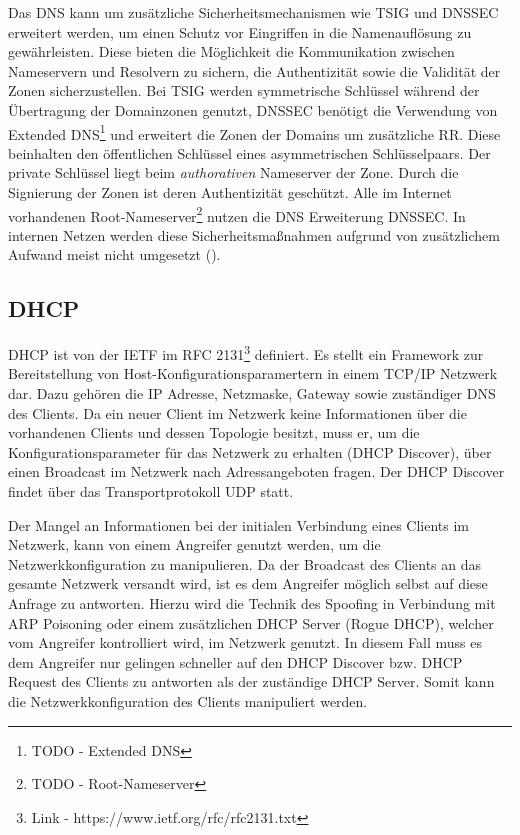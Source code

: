 Das \ac{DNS} kann um zusätzliche Sicherheitsmechanismen wie \ac{TSIG} und \ac{DNSSEC} erweitert werden, um einen Schutz vor Eingriffen in die Namenauflösung zu gewährleisten. Diese bieten die Möglichkeit die Kommunikation zwischen Nameservern und Resolvern zu sichern, die Authentizität sowie die Validität der Zonen sicherzustellen. Bei \ac{TSIG} werden symmetrische Schlüssel während der Übertragung der Domainzonen genutzt, \ac{DNSSEC} benötigt die Verwendung von Extended \ac{DNS}\footnote{TODO - Extended DNS} und erweitert die Zonen der Domains um zusätzliche \ac{RR}. Diese beinhalten den öffentlichen Schlüssel eines asymmetrischen Schlüsselpaars. Der private Schlüssel liegt beim \textit{authorativen} Nameserver der Zone. Durch die Signierung der Zonen ist deren Authentizität geschützt. Alle im Internet vorhandenen Root-Nameserver\footnote{TODO - Root-Nameserver} nutzen die \ac{DNS} Erweiterung \ac{DNSSEC}. In internen Netzen werden diese Sicherheitsmaßnahmen aufgrund von zusätzlichem Aufwand meist nicht umgesetzt (\cite{Ledermueller2009}).

\subsection{\ac{DHCP}}
\label{Analyse:DHCP}
\ac{DHCP} ist von der \ac{IETF} im \ac{RFC} 2131\footnote{Link - https://www.ietf.org/rfc/rfc2131.txt} definiert. Es stellt ein Framework zur Bereitstellung von Host-Konfigurationsparamertern in einem \ac{TCP}/\ac{IP} Netzwerk dar. Dazu gehören die \ac{IP} Adresse, Netzmaske, Gateway sowie zuständiger \ac{DNS} des Clients. Da ein neuer Client im Netzwerk keine Informationen über die vorhandenen Clients und dessen Topologie besitzt, muss er, um die Konfigurationsparameter für das Netzwerk zu erhalten (\ac{DHCP} Discover), über einen Broadcast im Netzwerk nach Adressangeboten fragen. Der \ac{DHCP} Discover findet über das Transportprotokoll \ac{UDP} statt.

Der Mangel an Informationen bei der initialen Verbindung eines Clients im Netzwerk, kann von einem Angreifer genutzt werden, um die Netzwerkkonfiguration zu manipulieren. Da der Broadcast des Clients an das gesamte Netzwerk versandt wird, ist es dem Angreifer möglich selbst auf diese Anfrage zu antworten. Hierzu wird die Technik des Spoofing in Verbindung mit \ac{ARP} Poisoning oder einem zusätzlichen \ac{DHCP} Server (Rogue \ac{DHCP}), welcher vom Angreifer kontrolliert wird, im Netzwerk genutzt. In diesem Fall muss es dem Angreifer nur gelingen schneller auf den \ac{DHCP} Discover bzw. \ac{DHCP} Request des Clients zu antworten als der zuständige \ac{DHCP} Server. Somit kann die Netzwerkkonfiguration des Clients manipuliert werden.

